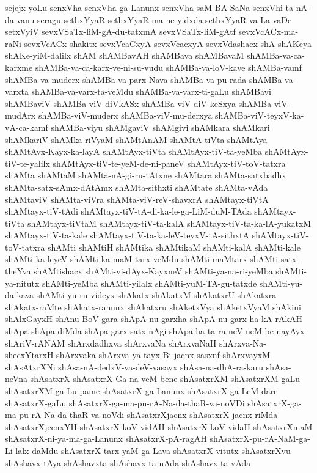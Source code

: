 {sejejx-yoLu
senxVha
senxVha-ga-Lanunx
senxVha-saM-BA-SaNa
senxVhi-ta-nA-da-vanu
seragu
sethxYyaR
sethxYyaR-ma-ne-yidxda
sethxYyaR-va-La-vaDe
setxVyiV
sevxVSaTx-liM-gA-du-tatxmA
sevxVSaTx-liM-gAtf
sevxVcACx-ma-raNi
sevxVcACx-shakitx
sevxVcaCxyA
sevxVcacxyA
sevxVdashacx
shA
shAKeya
shAKe-yiM-dalilx
shAM
shAMBavAH
shAMBava
shAMBavaM
shAMBa-va-ca-karxme
shAMBa-va-ca-karx-ve-ni-su-vudu
shAMBa-va-loV-kave
shAMBa-vamf
shAMBa-va-muderx
shAMBa-va-parx-Nava
shAMBa-va-pu-rada
shAMBa-va-varxta
shAMBa-va-varx-ta-veMdu
shAMBa-va-varx-ti-gaLu
shAMBavi
shAMBaviV
shAMBa-viV-diVkASx
shAMBa-viV-diV-keSxya
shAMBa-viV-mudArx
shAMBa-viV-muderx
shAMBa-viV-mu-derxya
shAMBa-viV-teyxV-ka-vA-ca-kamf
shAMBa-viyu
shAMgaviV
shAMgivi
shAMkara
shAMkari
shAMkariV
shAMka-riVyaM
shAMtAnAM
shAMtA-tiVta
shAMtAya
shAMtAyx-Kayx-ka-layA
shAMtAyx-tiVta
shAMtAyx-tiV-ta-yeMba
shAMtAyx-tiV-te-yalilx
shAMtAyx-tiV-te-yeM-de-ni-paneV
shAMtAyx-tiV-toV-tatxra
shAMta
shAMtaM
shAMta-nA-gi-ru-tAtxne
shAMtara
shAMta-satxbadhx
shAMta-satx-sAmx-dAtAmx
shAMta-sithxti
shAMtate
shAMta-vAda
shAMtaviV
shAMta-viVra
shAMta-viV-reV-shavxrA
shAMtayx-tiVtA
shAMtayx-tiV-tAdi
shAMtayx-tiV-tA-di-ka-le-ga-LiM-duM-TAda
shAMtayx-tiVta
shAMtayx-tiVtaM
shAMtayx-tiV-ta-kalA
shAMtayx-tiV-ta-ka-lA-yukatxM
shAMtayx-tiV-ta-kale
shAMtayx-tiV-ta-ka-leV-teyxV-tA-sithxtA
shAMtayx-tiV-toV-tatxra
shAMti
shAMtiH
shAMtika
shAMtikaM
shAMti-kalA
shAMti-kale
shAMti-ka-leyeV
shAMti-ka-maM-tarx-veMdu
shAMti-maMtarx
shAMti-satx-theYva
shAMtishacx
shAMti-vi-dAyx-KayxneV
shAMti-ya-na-ri-yeMba
shAMti-ya-nitutx
shAMti-yeMba
shAMti-yilalx
shAMti-yuM-TA-gu-tatxde
shAMti-yu-da-kava
shAMti-yu-ru-videyx
shAkatx
shAkatxM
shAkatxrU
shAkatxra
shAkatx-raMte
shAkatx-ranunx
shAkatxru
shAketxVya
shAketxVyaM
shAkini
shAlxGayxH
shAnu-BoV-gara
shApA-nu-garxha
shApA-nu-garx-ha-kA-rAkAH
shApa
shApa-diMda
shApa-garx-satx-nAgi
shApa-ha-ta-ra-neV-neM-be-nayAyx
shAriV-rANAM
shArxdadhxva
shArxvaNa
shArxvaNaH
shArxva-Na-shecxYtarxH
shArxvaka
shArxva-ya-tayx-Bi-jacnx-sasxnf
shArxvayxM
shAsAtxrXNi
shAsa-nA-dedxV-va-deV-vasayx
shAsa-na-dhA-ra-karu
shAsa-neVna
shAsatxrX
shAsatxrX-Ga-na-veM-bene
shAsatxrXM
shAsatxrXM-gaLu
shAsatxrXM-ga-Lu-pame
shAsatxrX-ga-Lanunx
shAsatxrX-ga-LeM-dare
shAsatxrX-gaLu
shAsatxrX-ga-ma-pu-rA-Na-da-thaR-va-noVDi
shAsatxrX-ga-ma-pu-rA-Na-da-thaR-va-noVdi
shAsatxrXjacnx
shAsatxrX-jacnx-riMda
shAsatxrXjecnxYH
shAsatxrX-koV-vidAH
shAsatxrX-koV-vidaH
shAsatxrXmaM
shAsatxrX-ni-ya-ma-ga-Lanunx
shAsatxrX-pA-ragAH
shAsatxrX-pu-rA-NaM-ga-Li-lalx-daMdu
shAsatxrX-tarx-yaM-ga-Lava
shAsatxrX-vitutx
shAsatxrXvu
shAshavx-tAya
shAshavxta
shAshavx-ta-nAda
shAshavx-ta-vAda
}
